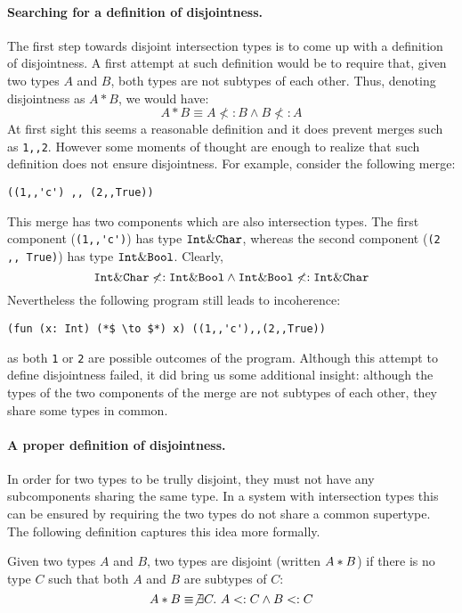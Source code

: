 \paragraph{Searching for a definition of disjointness.}
The first step towards disjoint intersection types is to come up
with a definition of disjointness. A first attempt at such definition would
be to require that, given two types $A$ and $B$, both types are not
subtypes of each other. Thus, denoting disjointness as $A * B$, we would have:
\[A * B \equiv A \not<: B \wedge B \not<: A\]
At first sight this seems a reasonable definition and it does prevent
merges such as \lstinline{1,,2}. However some moments of thought are enough to realize that
such definition does not ensure disjointness. For example, consider
the following merge:

\begin{lstlisting}
((1,,'c') ,, (2,,True))
\end{lstlisting}

\noindent This merge has two components which are also intersection
types. The first component (\lstinline{(1,,'c')}) has type $\texttt{Int} \&
\texttt{Char}$, whereas the second component (\lstinline{(2 ,, True)}) has type
$\texttt{Int} \& \texttt{Bool}$. Clearly,
\[ \texttt{Int} \& \texttt{Char} \not <: \texttt{Int} \& \texttt{Bool} \wedge \texttt{Int} \& \texttt{Bool} \not <: \texttt{Int} \& \texttt{Char} \]
Nevertheless the following program still leads to
incoherence:
\begin{lstlisting}
(fun (x: Int) (*$ \to $*) x) ((1,,'c'),,(2,,True))
\end{lstlisting}
as both \lstinline{1} or \lstinline{2} are possible outcomes
of the program. Although this attempt to define disjointness failed,
it did bring us some additional insight: although the types of the two
components of the merge are not subtypes of each other, they share
some types in common.

\paragraph{A proper definition of disjointness.} In order for two types
to be trully disjoint, they must not have any subcomponents sharing
the same type. In a system with intersection types this can be ensured
by requiring the two types do not share a common supertype. The
following definition captures this idea more formally.

\begin{definition}[Disjointness]
  Given two types $A$ and $B$, two types are disjoint
  (written $A * B$) if there is no type $C$ such that both $A$ and $B$ are
  subtypes of $C$:
  \[A * B \equiv \not\exists C.~A <: C \wedge B <: C\]
\end{definition}

